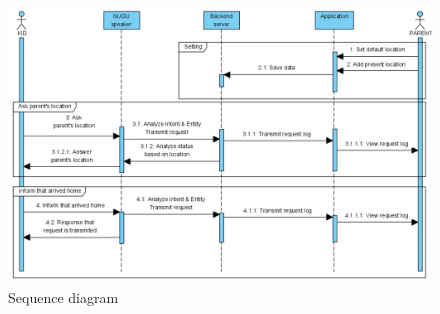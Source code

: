 \documentclass[conference]{IEEEtran}
\begin{document}
\begin{figure}
    \centering
    \includegraphics{images/f5.png}
    \caption{Sequence diagram}
\end{figure}
\end{document}
